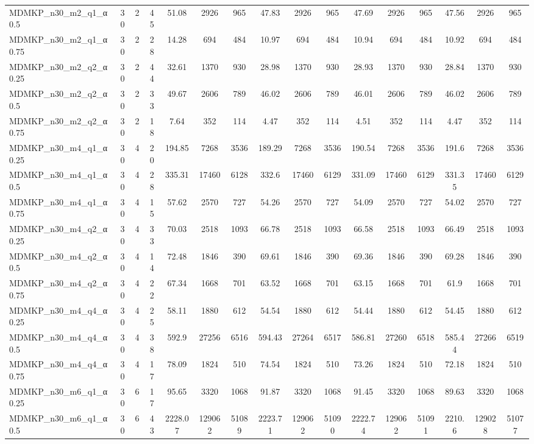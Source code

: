 \begin{sidewaystable}[!ht]
{\begin{tabular}{lccccccccccccccc}
MDMKP\_n30\_m2\_q1\_α0.5 & 30 & 2 & 45 & 51.08 & 2926 & 965 & 47.83 & 2926 & 965 & 47.69 & 2926 & 965 & 47.56 & 2926 & 965 \\
MDMKP\_n30\_m2\_q1\_α0.75 & 30 & 2 & 28 & 14.28 & 694 & 484 & 10.97 & 694 & 484 & 10.94 & 694 & 484 & 10.92 & 694 & 484 \\
MDMKP\_n30\_m2\_q2\_α0.25 & 30 & 2 & 44 & 32.61 & 1370 & 930 & 28.98 & 1370 & 930 & 28.93 & 1370 & 930 & 28.84 & 1370 & 930 \\
MDMKP\_n30\_m2\_q2\_α0.5 & 30 & 2 & 33 & 49.67 & 2606 & 789 & 46.02 & 2606 & 789 & 46.01 & 2606 & 789 & 46.02 & 2606 & 789 \\
MDMKP\_n30\_m2\_q2\_α0.75 & 30 & 2 & 18 & 7.64 & 352 & 114 & 4.47 & 352 & 114 & 4.51 & 352 & 114 & 4.47 & 352 & 114 \\
MDMKP\_n30\_m4\_q1\_α0.25 & 30 & 4 & 20 & 194.85 & 7268 & 3536 & 189.29 & 7268 & 3536 & 190.54 & 7268 & 3536 & 191.6 & 7268 & 3536 \\
MDMKP\_n30\_m4\_q1\_α0.5 & 30 & 4 & 28 & 335.31 & 17460 & 6128 & 332.6 & 17460 & 6129 & 331.09 & 17460 & 6129 & 331.35 & 17460 & 6129 \\
MDMKP\_n30\_m4\_q1\_α0.75 & 30 & 4 & 15 & 57.62 & 2570 & 727 & 54.26 & 2570 & 727 & 54.09 & 2570 & 727 & 54.02 & 2570 & 727 \\
MDMKP\_n30\_m4\_q2\_α0.25 & 30 & 4 & 33 & 70.03 & 2518 & 1093 & 66.78 & 2518 & 1093 & 66.58 & 2518 & 1093 & 66.49 & 2518 & 1093 \\
MDMKP\_n30\_m4\_q2\_α0.5 & 30 & 4 & 14 & 72.48 & 1846 & 390 & 69.61 & 1846 & 390 & 69.36 & 1846 & 390 & 69.28 & 1846 & 390 \\
MDMKP\_n30\_m4\_q2\_α0.75 & 30 & 4 & 22 & 67.34 & 1668 & 701 & 63.52 & 1668 & 701 & 63.15 & 1668 & 701 & 61.9 & 1668 & 701 \\
MDMKP\_n30\_m4\_q4\_α0.25 & 30 & 4 & 25 & 58.11 & 1880 & 612 & 54.54 & 1880 & 612 & 54.44 & 1880 & 612 & 54.45 & 1880 & 612 \\
MDMKP\_n30\_m4\_q4\_α0.5 & 30 & 4 & 38 & 592.9 & 27256 & 6516 & 594.43 & 27264 & 6517 & 586.81 & 27260 & 6518 &  \textcolor{blue2}{585.44} & 27266 & 6519 \\
MDMKP\_n30\_m4\_q4\_α0.75 & 30 & 4 & 17 & 78.09 & 1824 & 510 & 74.54 & 1824 & 510 & 73.26 & 1824 & 510 & 72.18 & 1824 & 510 \\
MDMKP\_n30\_m6\_q1\_α0.25 & 30 & 6 & 17 & 95.65 & 3320 & 1068 & 91.87 & 3320 & 1068 & 91.45 & 3320 & 1068 & 89.63 & 3320 & 1068 \\
MDMKP\_n30\_m6\_q1\_α0.5 & 30 & 6 & 43 & 2228.07 & 129062 & 51089 & 2223.71 & 129062 & 51090 & 2222.74 & 129062 & 51091 &  \textcolor{blue2}{2210.6} & 129028 & 51077 \\

\end{tabular}}
\end{sidewaystable}

